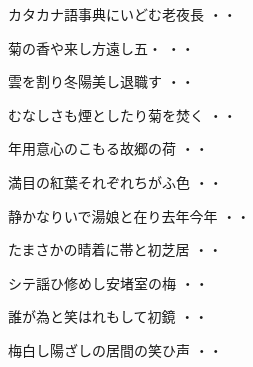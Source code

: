 \vspace{0.6cm}
\begin{shiika}カタカナ語事典にいどむ老夜長
\hfill{・・}\end{shiika}
\vspace{0.6cm}
\begin{shiika}菊の香や来し方遠し五・
\hfill{・・}\end{shiika}
\vspace{0.6cm}
\begin{shiika}雲を割り冬陽美し退職す
\hfill{・・}\end{shiika}
\vspace{0.6cm}
\begin{shiika}むなしさも煙としたり菊を焚く
\hfill{・・}\end{shiika}
\vspace{0.6cm}
\begin{shiika}年用意心のこもる故郷の荷
\hfill{・・}\end{shiika}
\vspace{0.6cm}
\begin{shiika}満目の紅葉それぞれちがふ色
\hfill{・・}\end{shiika}
\vspace{0.6cm}
\begin{shiika}静かなりいで湯娘と在り去年今年
\hfill{・・}\end{shiika}
\vspace{0.6cm}
\begin{shiika}たまさかの晴着に帯と初芝居
\hfill{・・}\end{shiika}
\vspace{0.6cm}
\begin{shiika}シテ謡ひ修めし安堵室の梅
\hfill{・・}\end{shiika}
\vspace{0.6cm}
\begin{shiika}誰が為と笑はれもして初鏡
\hfill{・・}\end{shiika}
\vspace{0.6cm}
\begin{shiika}梅白し陽ざしの居間の笑ひ声
\hfill{・・}\end{shiika}
